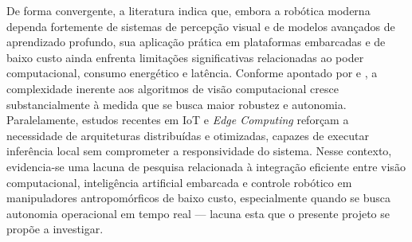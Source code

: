 De forma convergente, a literatura indica que, embora a robótica moderna dependa fortemente de sistemas de percepção visual e de modelos avançados de aprendizado profundo, sua aplicação prática em plataformas embarcadas e de baixo custo ainda enfrenta limitações significativas relacionadas ao poder computacional, consumo energético e latência. Conforme apontado por  e , a complexidade inerente aos algoritmos de visão computacional cresce substancialmente à medida que se busca maior robustez e autonomia. Paralelamente, estudos recentes em IoT e \textit{Edge Computing}  reforçam a necessidade de arquiteturas distribuídas e otimizadas, capazes de executar inferência local sem comprometer a responsividade do sistema. Nesse contexto, evidencia-se uma lacuna de pesquisa relacionada à integração eficiente entre visão computacional, inteligência artificial embarcada e controle robótico em manipuladores antropomórficos de baixo custo, especialmente quando se busca autonomia operacional em tempo real — lacuna esta que o presente projeto se propõe a investigar.